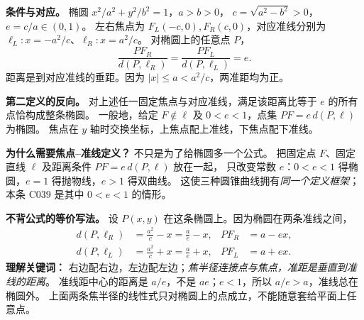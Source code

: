 \begin{statementbox}
\textbf{条件与对应。} 椭圆 $x^2/a^2+y^2/b^2=1$，$a>b>0$，
$c=\sqrt{a^2-b^2}>0$，$e=c/a\in(0,1)$。
左右焦点为 $F_L(-c,0),F_R(c,0)$，对应准线分别为
$\ell_L:x=-a^2/c$、$\ell_R:x=a^2/c$。
对椭圆上的任意点 $P$，
\[
\boxed{\frac{PF_R}{d(P,\ell_R)}=\frac{PF_L}{d(P,\ell_L)}=e}.
\]
距离是到对应准线的垂距。因为 $|x|\le a<a^2/c$，两准距均为正。

\textbf{第二定义的反向。} 对上述任一固定焦点与对应准线，满足该距离比等于 $e$ 的所有点恰构成整条椭圆。
一般地，给定 $F\notin\ell$ 及 $0<e<1$，点集 $PF=e\,d(P,\ell)$ 为椭圆。
焦点在 $y$ 轴时交换坐标，上焦点配上准线，下焦点配下准线。

\medskip
\textbf{为什么需要焦点--准线定义？} 不只是为了给椭圆多一个公式。
把固定点 $F$、固定直线 $\ell$ 及距离条件 $PF=e\,d(P,\ell)$ 放在一起，
只改变常数 $e$：$0<e<1$ 得椭圆，$e=1$ 得抛物线，$e>1$ 得双曲线。
这使三种圆锥曲线拥有\emph{同一个定义框架}；本条 C039 是其中 $0<e<1$ 的情形。

\medskip
\textbf{不背公式的等价写法。} 设 $P(x,y)$ 在这条椭圆上。因为椭圆在两条准线之间，
\[
\begin{aligned}
d(P,\ell_R)&=\frac{a^2}{c}-x=\frac ae-x, &PF_R&=a-ex,\\
d(P,\ell_L)&=\frac{a^2}{c}+x=\frac ae+x, &PF_L&=a+ex.
\end{aligned}
\]
\textbf{理解关键词：} 右边配右边，左边配左边；\emph{焦半径连接点与焦点，准距是垂直到准线的距离}。
准线距中心的距离是 $a/e$，不是 $ae$；$e<1$，所以 $a/e>a$，准线总在椭圆外。
上面两条焦半径的线性式只对椭圆上的点成立，不能随意套给平面上任意点。

\end{statementbox}

